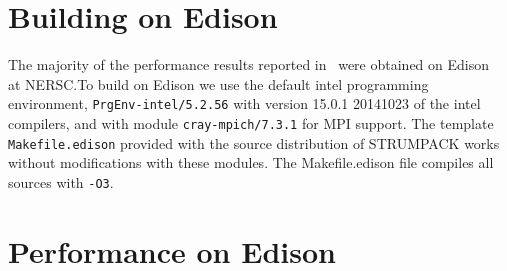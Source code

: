 \documentclass{acmsmall}
\begin{document}
\section{Building on Edison}

The majority of the performance results reported
in~\cite{rouet:strumpack} were obtained on Edison~\cite{Edison} at
NERSC.\@ To build \strumpack{} on Edison we use the default intel
programming environment, \verb!PrgEnv-intel/5.2.56!  with version
15.0.1 20141023 of the intel compilers, and with module
\verb!cray-mpich/7.3.1! for MPI support.  The template
\verb!Makefile.edison! provided with the source distribution of
STRUMPACK works without modifications with these modules.  The
Makefile.edison file compiles all sources with \verb!-O3!.


\section{Performance on Edison}
\end{document}
